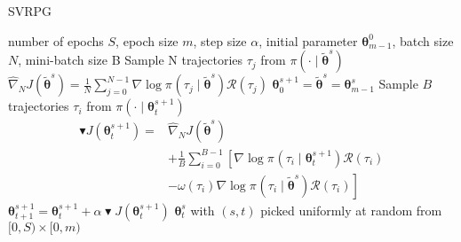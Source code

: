 \documentclass{article}
\theoremstyle{remark}
\theoremstyle{definition}
\newcommand{\vtheta}{\boldsymbol{\theta}}
\newcommand{\Reward}{\mathcal{R}}
\newcommand{\score}[2]{\nabla\log\pi_{#1}(#2)}
\newcommand{\gradApp}[2]{\widehat{\nabla}_{#2}J(#1)}
\begin{document}
\begin{algorithm}[tb]
	\caption{SVRPG}
	\label{alg:svrpg}
	\begin{algorithmic}
		 number of epochs $S$, epoch size $m$, step size $\alpha$, initial parameter $\vtheta_{m-1}^0$, batch size $N$, mini-batch size B
		\STATE Sample N trajectories $\tau_j$ from $\pi(\cdot\mid\tilde{\vtheta}^{s})$
		\STATE $\gradApp{\tilde{\vtheta}^{s}}{N} = \frac{1}{N}\sum_{j=0}^{N-1}\score{}{\tau_j\mid\tilde{\vtheta}^{s}}\Reward(\tau_j)$
		\STATE $\vtheta_0^{s+1} = \tilde{\vtheta}^s = \vtheta_{m-1}^s$
		\STATE Sample $B$ trajectories $\tau_i$ from 				$\pi(\cdot\mid\vtheta_t^{s+1})$
		\STATE 
		\begin{align*}
		\blacktriangledown J(\vtheta_t^{s+1}) = 
		&\gradApp{\tilde{\vtheta}^s}{N} \\
		&+\frac{1}{B}\sum_{i=0}^{B-1}\left[ 
		\score{}{\tau_i\mid\vtheta_t^{s+1}}\Reward(\tau_i)\right. \\
		&\left. - \omega(\tau_i)\score{}{\tau_i \mid \tilde{\vtheta}^{s}}\Reward(\tau_i)\right]
		\end{align*}
		\STATE $\vtheta_{t+1}^{s+1} = \vtheta_t^{s+1} + \alpha\blacktriangledown J(\vtheta_t^{s+1})$
		\ENDFOR
		\ENDFOR
		 $\vtheta_t^s$ with $(s,t)$ picked uniformly at random from $[0,S)\times[0,m)$
	\end{algorithmic}
\end{algorithm}
\end{document}

